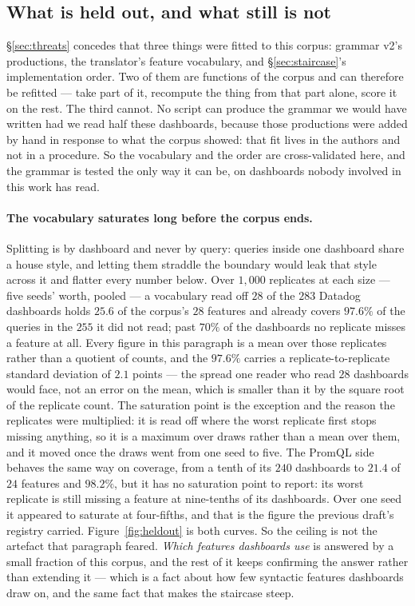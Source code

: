 \subsection{What is held out, and what still is not}
\label{sec:heldout}

\S\ref{sec:threats} concedes that three things were fitted to this corpus: grammar v2's
productions, the translator's feature vocabulary, and \S\ref{sec:staircase}'s
implementation order. Two of them are functions of the corpus and can therefore be
refitted --- take part of it, recompute the thing from that part alone, score it on the
rest. The third cannot. No script can produce the grammar we would have written had we
read half these dashboards, because those productions were added by hand in response to
what the corpus showed: that fit lives in the authors and not in a procedure. So the
vocabulary and the order are cross-validated here, and the grammar is tested the only way
it can be, on dashboards nobody involved in this work has read.

\paragraph{The vocabulary saturates long before the corpus ends.}
Splitting is by dashboard and never by query: queries inside one dashboard share a house
style, and letting them straddle the boundary would leak that style across it and flatter
every number below. Over $1{,}000$ replicates at each size --- five seeds' worth, pooled
--- a vocabulary read off $28$ of the $283$ Datadog dashboards holds $25.6$ of the
corpus's $28$ features and already covers $97.6\%$ of the queries in the $255$ it did not
read; past $70\%$ of the dashboards no replicate misses a feature at all. Every figure in
this paragraph is a mean over those replicates rather than a quotient of counts, and the
$97.6\%$ carries a replicate-to-replicate standard deviation of $2.1$ points --- the
spread one reader who read $28$ dashboards would face, not an error on the mean, which is
smaller than it by the square root of the replicate count. The saturation point is the
exception and the reason the replicates were multiplied: it is read off where the
worst replicate first stops missing anything, so it is a maximum over draws rather than a
mean over them, and it moved once the draws went from one seed to five. The PromQL
side behaves the same way on coverage, from a tenth of its $240$ dashboards to $21.4$
of $24$ features and $98.2\%$, but it has no saturation point to report: its worst
replicate is still missing a feature at nine-tenths of its dashboards. Over one seed it
appeared to saturate at four-fifths, and that is the figure the previous draft's registry
carried.
Figure~\ref{fig:heldout} is both curves. So the ceiling is not the artefact that paragraph
feared. \emph{Which features dashboards use} is answered by a small fraction of this
corpus, and the rest of it keeps confirming the answer rather than extending it --- which
is a fact about how few syntactic features dashboards draw on, and the same fact that
makes the staircase steep.

